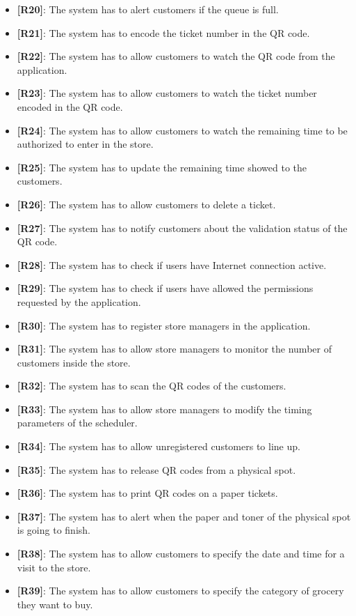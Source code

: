 \begin{itemize}
	\item {\textbf{[R20]}}: The system has to alert customers if the queue is full.
	\item {\textbf{[R21]}}: The system has to encode the ticket number in the QR code.
	\item {\textbf{[R22]}}: The system has to allow customers to watch the QR code from the application.
	\item {\textbf{[R23]}}: The system has to allow customers to watch the ticket number encoded in the QR code.
	\item {\textbf{[R24]}}: The system has to allow customers to watch the remaining time to be authorized to enter in the store.
	\item {\textbf{[R25]}}: The system has to update the remaining time showed to the customers.
	\item {\textbf{[R26]}}: The system has to allow customers to delete a ticket.
	\item {\textbf{[R27]}}: The system has to notify customers about the validation status of the QR code.
	\item {\textbf{[R28]}}: The system has to check if users have Internet connection active.
	\item {\textbf{[R29]}}: The system has to check if users have allowed the permissions requested by the application.
	\item {\textbf{[R30]}}: The system has to register store managers in the application.
	\item {\textbf{[R31]}}: The system has to allow store managers to monitor the number of customers inside the store.
	\item {\textbf{[R32]}}: The system has to scan the QR codes of the customers.
	\item {\textbf{[R33]}}: The system has to allow store managers to modify the timing parameters of the scheduler.
	\item {\textbf{[R34]}}: The system has to allow unregistered customers to line up.
	\item {\textbf{[R35]}}: The system has to release QR codes from a physical spot.
	\item {\textbf{[R36]}}: The system has to print QR codes on a paper tickets.
	\item {\textbf{[R37]}}: The system has to alert when the paper and toner of the physical spot is going to finish.
	\item {\textbf{[R38]}}: The system has to allow customers to specify the date and time for a visit to the store.
	\item {\textbf{[R39]}}: The system has to allow customers to specify the category of grocery they want to buy.

\end{itemize}

